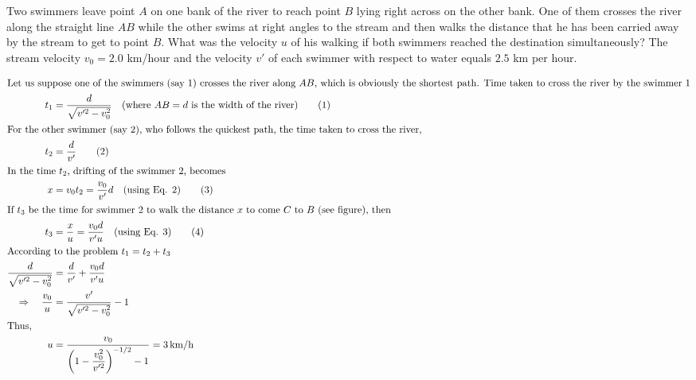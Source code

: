 \item Two swimmers leave point \( A \) on one bank of the river to reach point \( B \) lying right across on the other bank. One of them crosses the river along the straight line \( AB \) while the other swims at right angles to the stream and then walks the distance that he has been carried away by the stream to get to point \( B \). What was the velocity \( u \) of his walking if both swimmers reached the destination simultaneously? The stream velocity \( v_0 = 2.0 \) km/hour and the velocity \( v' \) of each swimmer with respect to water equals \( 2.5 \) km per hour.

\begin{solution}
    \begin{center}
    \end{center}
    
    \begin{align*}
        \intertext{Let us suppose one of the swimmers (say 1) crosses the river along \(AB\), which is obviously the shortest path. Time taken to cross the river by the swimmer 1}
        t_1 &= \dfrac{d}{\sqrt{v'^2 - v_0^2}} \quad \text{(where \(AB = d\) is the width of the river)} \tag{1}\\
        \intertext{For the other swimmer (say 2), who follows the quickest path, the time taken to cross the river,}
        t_2 &= \dfrac{d}{v'} \tag{2}\\
        \intertext{In the time \(t_2\), drifting of the swimmer 2, becomes}
        x &= v_0 t_2 = \dfrac{v_0}{v'}d \quad \text{(using Eq. 2)} \tag{3}\\
        \intertext{If \(t_3\) be the time for swimmer 2 to walk the distance \(x\) to come \(C\) to \(B\) (see figure), then}
        t_3 &= \dfrac{x}{u} = \dfrac{v_0 d}{v' u} \quad \text{(using Eq. 3)} \tag{4}\\
        \intertext{According to the problem \(t_1 = t_2 + t_3\)}
        \dfrac{d}{\sqrt{v'^2 - v_0^2}} &= \dfrac{d}{v'} + \dfrac{v_0 d}{v' u}\\
        \Rightarrow \quad \dfrac{v_0}{u} &= \dfrac{v'}{\sqrt{v'^2 - v_0^2}} - 1\\
        \intertext{Thus,}
        u &= \dfrac{v_0}{\left(1 - \dfrac{v_0^2}{v'^2}\right)^{-1/2} - 1} = 3 \, \text{km/h}
    \end{align*}
\end{solution}
